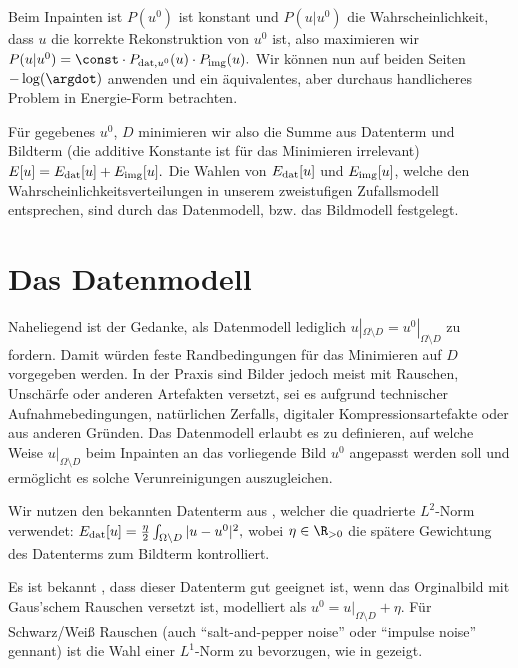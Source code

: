 \documentclass{mythesis}
\begin{document}
Beim Inpainten ist $P(u^0)$ ist konstant und $P(u|u^0)$ die Wahrscheinlichkeit, dass $u$ die korrekte Rekonstruktion von $u^0$ ist, also maximieren wir
\begin{math}
    P(u|u^0) = \const \cdot P_{\mathrm{dat},u^0}(u) \cdot P_{\mathrm{img}}(u).
\end{math}
Wir können nun auf beiden Seiten $-\log(\argdot)$ anwenden und ein äquivalentes, aber durchaus handlicheres Problem in Energie-Form betrachten.

Für gegebenes $u^0$, $D$ minimieren wir also die Summe aus Datenterm und Bildterm (die additive Konstante ist für das Minimieren irrelevant)
\begin{math}
    E[u] = E_{\mathrm{dat}}[u] + E_{\mathrm{img}}[u].
\end{math}
Die Wahlen von $E_{\mathrm{dat}}[u]$ und $E_{\mathrm{img}}[u]$, welche den Wahrscheinlichkeitsverteilungen in unserem zweistufigen Zufallsmodell entsprechen, sind durch das Datenmodell, bzw. das Bildmodell festgelegt.


\section{Das Datenmodell}

Naheliegend ist der Gedanke, als Datenmodell lediglich $u|_{\Omega \setminus D} = u^0|_{\Omega \setminus D}$ zu fordern.
Damit würden feste Randbedingungen für das Minimieren auf $D$ vorgegeben werden.
In der Praxis sind Bilder jedoch meist mit Rauschen, Unschärfe oder anderen Artefakten versetzt, sei es aufgrund technischer Aufnahmebedingungen, natürlichen Zerfalls, digitaler Kompressionsartefakte oder aus anderen Gründen.
Das Datenmodell erlaubt es zu definieren, auf welche Weise $u|_{\Omega \setminus D}$ beim Inpainten an das vorliegende Bild $u^0$ angepasst werden soll und ermöglicht es solche Verunreinigungen auszugleichen.

Wir nutzen den bekannten Datenterm aus \cite{rudin1992nonlinear}, welcher die quadrierte $L^2$-Norm verwendet:
\begin{math}
    E_{\mathrm{dat}}[u] = \frac{\eta}{2} \int_{\Omega \setminus D} |u - u^0|^2,
\end{math}
wobei $\eta \in \R_{> 0}$ die spätere Gewichtung des Datenterms zum Bildterm kontrolliert.

Es ist bekannt \cite[§4.5]{chan2005image}, dass dieser Datenterm gut geeignet ist, wenn das Orginalbild mit Gaus'schem Rauschen versetzt ist, modelliert als $u^0 = u|_{\Omega \setminus D} + \eta$.
Für Schwarz/Weiß Rauschen (auch “salt-and-pepper noise” oder “impulse noise” gennant) ist die Wahl einer $L^1$-Norm zu bevorzugen, wie in \cite{nikolova2004variational} gezeigt.
\end{document}
